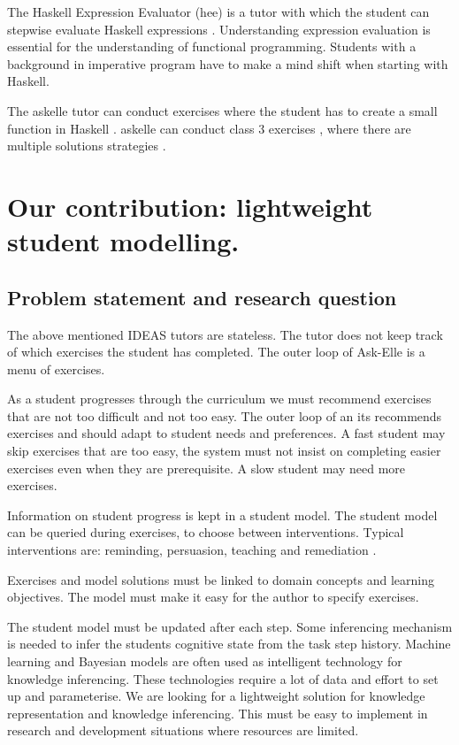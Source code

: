 The Haskell Expression Evaluator (\gls{hee}) is a tutor with which the student can stepwise evaluate Haskell expressions \citep{tutorHEE}. 
Understanding expression evaluation is essential for the understanding of functional programming.
Students with a background in imperative program have to make a mind shift when starting with Haskell.

The \gls{askelle} tutor can conduct exercises where the student has to create a small function in Haskell \citep{ideas2}.
\Gls{askelle} can conduct class 3 exercises \citep{exerciseClasses}, where there are multiple solutions strategies \citep{Gerdes2017}.


\section{Our contribution: lightweight student modelling.}

\subsection{Problem statement and research question}
\label{sec:problstmt}
The above mentioned IDEAS tutors are stateless. 
The tutor does not keep track of which exercises the student has completed.
The outer loop of Ask-Elle is a menu of exercises. 

As a student progresses through the curriculum we must recommend exercises that are not too difficult and not too easy.
The outer loop of an \gls{its}   recommends exercises and  should adapt to student needs and preferences. 
A fast student may skip exercises that are too easy, the system must not insist on completing easier exercises even when they are prerequisite.
A slow student may need  more exercises.

Information on student progress is kept in a student model.
The student model can be queried during exercises, to choose between interventions. 
Typical interventions are: reminding, persuasion, teaching and remediation \citep{loops}.

Exercises and model solutions must be linked to domain concepts and learning objectives.
The model must make it easy for the author to specify exercises.

The student model must be updated after each step. 
Some inferencing mechanism is needed to infer the students cognitive state from the task step history.
Machine learning and Bayesian models are often used as intelligent technology for knowledge inferencing.
These technologies require a lot of data and effort to set up and parameterise.
We are looking for a lightweight solution for knowledge representation and knowledge inferencing.
This must be easy to implement in research and development situations where resources are limited.

